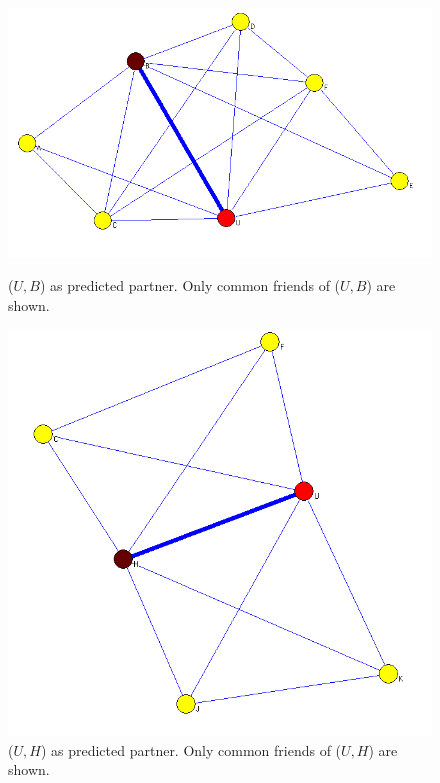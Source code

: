 \documentclass[]{article}
\begin{document}
\begin{figure}[ht]
\begin{minipage}[b]{0.5\linewidth}
\centering
\includegraphics[width=\textwidth]{p1dispersion.png}
\caption{($U,B$) as predicted partner. Only common friends of ($U,B$) are shown.}
\label{fig:figure1}
\end{minipage}
\hspace{0.5cm}
\begin{minipage}[b]{0.5\linewidth}
\centering
\includegraphics[width=\textwidth]{p2dispersion.png}
\caption{($U,H$) as predicted partner.  Only common friends of ($U,H$) are shown.}
\label{fig:figure2}
\end{minipage}
\end{figure}
\end{document}
